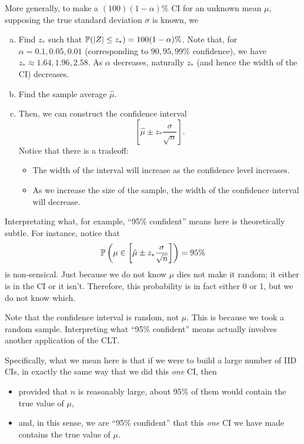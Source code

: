More generally, to make a $(100)(1 - \alpha)\%$ CI for an unknown mean $\mu$, supposing the true standard deviation $\sigma$ is known, we 
\begin{enumerate}[(a)]
    \item Find $z_*$ such that $\mathbb{P}(|Z| \leq z_*) = 100(1 - \alpha)\%$. Note that, for $\alpha = 0.1, 0.05, 0.01$ (corresponding to $90, 95, 99\%$ confidence), we have $z_* \approx 1.64, 1.96, 2.58$. As $\alpha$ decreases, naturally $z_*$ (and hence the width of the CI) decreases. 
    \item Find the sample average $\hat{\mu}$. 
    \item Then, we can construct the confidence interval 
    \[\left[\hat{\mu} \pm z_* \frac{\sigma}{\sqrt{n}}\right].\]
    Notice that there is a tradeoff:
    \begin{itemize}
        \item The width of the interval will increase as the confidence level increases. 
        \item As we increase the size of the sample, the width of the confidence interval will decrease.  
    \end{itemize}
\end{enumerate}
Interpretating what, for example, ``95\% confident'' means here is theoretically subtle. For instance, notice that 
\[\mathbb{P}\left(\mu \in \left[\hat{\mu} \pm z_* \frac{\sigma}{\sqrt{n}}\right]\right) = 95\%\]
is non-sensical. Just because we do not know $\mu$ dies not make it random; it either is in the CI or it isn't. Therefore, this probability is in fact either 0 or 1, but we do not know which. 

\bigskip 

Note that the confidence interval is random, not $\mu$. This is because we took a random sample. Interpreting what ``95\% confident'' means actually involves another application of the CLT. 

\bigskip 

Specifically, what we mean here is that if we were to build a large number of IID CIs, in exactly the same way that we did this \emph{one} CI, then 
\begin{itemize}
    \item provided that $n$ is reasonably large, about 95\% of them would contain the true value of $\mu$,
    \item and, in this sense, we are ``95\% confident'' that this \emph{one} CI we have made contains the true value of $\mu$. 
\end{itemize}

